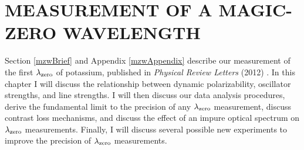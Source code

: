 \chapter{MEASUREMENT OF A MAGIC-ZERO WAVELENGTH}
\label{mzwChapter}

Section \ref{mzwBrief} and Appendix \ref{mzwAppendix} describe our measurement of the first $\lambda_\textrm{zero}$ of potassium, published in \emph{Physical Review Letters} (2012) \cite{Hol12a}. In this chapter I will discuss the relationship between dynamic polarizability, oscillator strengths, and line strengths. I will then discuss our data analysis procedures, derive the fundamental limit to the precision of any $\lambda_\textrm{zero}$ measurement, discuss contrast loss mechanisms, and discuss the effect of an impure optical spectrum on $\lambda_\textrm{zero}$ measurements. Finally, I will discuss several possible new experiments to improve the precision of $\lambda_\textrm{zero}$ measurements. 


